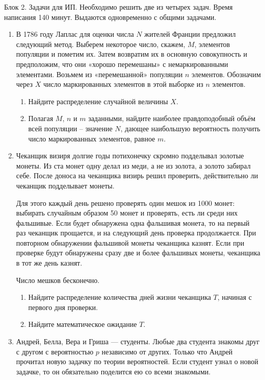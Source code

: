 \documentclass[12pt]{article}
\begin{document}
\newpage
Блок 2. Задачи для ИП. Необходимо решить две из четырех задач. Время написания 140 минут. Выдаются одновременно с общими задачами.

\begin{enumerate}[resume]
    \item В 1786 году Лаплас для оценки числа $N$ жителей Франции предложил следующий метод. 
    Выберем некоторое число, скажем, $M$, элементов популяции и пометим их. 
    Затем возвратим их в основную совокупность и предположим, что они «хорошо перемешаны» 
    с немаркированными элементами. Возьмем из «перемешанной» популяции $n$ элементов. 
    Обозначим через $X$ число маркированных элементов в этой выборке из $n$ элементов.

    \begin{enumerate}
        \item Найдите распределение случайной величины $X$.
        \item Полагая $M$, $n$ и $m$ заданными, найдите наиболее правдоподобный объём всей популяции – значение $N$, 
        дающее наибольшую вероятность получить число маркированных элементов, равное $m$.
    \end{enumerate}

    \item Чеканщик визиря долгие годы потихонечку скромно подделывал золотые монеты. 
    Из ста монет одну делал из меди, а не из золота, а золото забирал себе. 
    После доноса на чеканщика визирь решил проверить, действительно ли чеканщик подделывает монеты.

    Для этого каждый день решено проверять один мешок из 1000 монет: 
    выбирать случайным образом 50 монет и проверять, есть ли среди них фальшивые. 
    Если будет обнаружена одна фальшивая монета, то на первый раз чеканщик прощается, 
    и на следующий день проверка продолжается. При повторном обнаружении фальшивой монеты чеканщика казнят. Если при проверке будут обнаружены сразу две и более фальшивых монеты, чеканщика в тот же день казнят.

    Число мешков бесконечно.

    \begin{enumerate}
        \item Найдите распределение количества дней жизни чеканщика $T$, начиная с первого дня проверки.
        \item  Найдите математическое ожидание $T$.
    \end{enumerate}

    \item Андрей, Белла, Вера и Гриша — студенты. 
    Любые два студента знакомы друг с другом с вероятностью $p$ независимо от других.
    Только что Андрей прочитал новую задачку по теории вероятностей. Если студент узнал о новой задачке, то он обязательно поделится ею со всеми знакомыми.


\end{enumerate}
\end{document}
